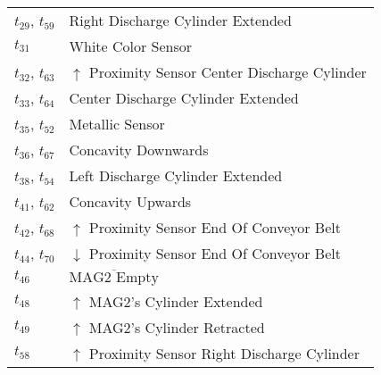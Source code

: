 \begin{longtable}{M{5cm}M{10cm}}
\hyperlink{completeNet:t29}{\hypertarget{completeTable:t29}{$t_{29}$}}, \hyperlink{completeNet:t59}{\hypertarget{completeTable:t59}{$t_{59}$}} & Right Discharge Cylinder Extended\\
\hyperlink{completeNet:t31}{\hypertarget{completeTable:t31}{$t_{31}$}} & White Color Sensor\\
\hyperlink{completeNet:t32}{\hypertarget{completeTable:t32}{$t_{32}$}}, \hyperlink{completeNet:t63}{\hypertarget{completeTable:t63}{$t_{63}$}} & \(\uparrow\) Proximity Sensor Center Discharge Cylinder\\
\hyperlink{completeNet:t33}{\hypertarget{completeTable:t33}{$t_{33}$}}, \hyperlink{completeNet:t64}{\hypertarget{completeTable:t64}{$t_{64}$}} & Center Discharge Cylinder Extended\\
\hyperlink{completeNet:t35}{\hypertarget{completeTable:t35}{$t_{35}$}}, \hyperlink{completeNet:t52}{\hypertarget{completeTable:t52}{$t_{52}$}} & Metallic Sensor\\
\hyperlink{completeNet:t36}{\hypertarget{completeTable:t36}{$t_{36}$}}, \hyperlink{completeNet:t67}{\hypertarget{completeTable:t67}{$t_{67}$}} & Concavity Downwards\\
\hyperlink{completeNet:t38}{\hypertarget{completeTable:t38}{$t_{38}$}}, \hyperlink{completeNet:t54}{\hypertarget{completeTable:t54}{$t_{54}$}} & Left Discharge Cylinder Extended\\
\hyperlink{completeNet:t41}{\hypertarget{completeTable:t41}{$t_{41}$}}, \hyperlink{completeNet:t62}{\hypertarget{completeTable:t62}{$t_{62}$}} & Concavity Upwards\\
\hyperlink{completeNet:t42}{\hypertarget{completeTable:t42}{$t_{42}$}}, \hyperlink{completeNet:t68}{\hypertarget{completeTable:t68}{$t_{68}$}} & \(\uparrow\) Proximity Sensor End Of Conveyor Belt\\
\hyperlink{completeNet:t44}{\hypertarget{completeTable:t44}{$t_{44}$}}, \hyperlink{completeNet:t70}{\hypertarget{completeTable:t70}{$t_{70}$}} & \(\downarrow\) Proximity Sensor End Of Conveyor Belt\\
\hyperlink{completeNet:t46}{\hypertarget{completeTable:t46}{$t_{46}$}} & \(\overline{\mbox{MAG2 Empty}}\)\\
\hyperlink{completeNet:t48}{\hypertarget{completeTable:t48}{$t_{48}$}} & \(\uparrow\) MAG2's Cylinder Extended\\
\hyperlink{completeNet:t49}{\hypertarget{completeTable:t49}{$t_{49}$}} & \(\uparrow\) MAG2's Cylinder Retracted\\
\hyperlink{completeNet:t58}{\hypertarget{completeTable:t58}{$t_{58}$}} & \(\uparrow\) Proximity Sensor Right Discharge Cylinder\\

\end{longtable}
